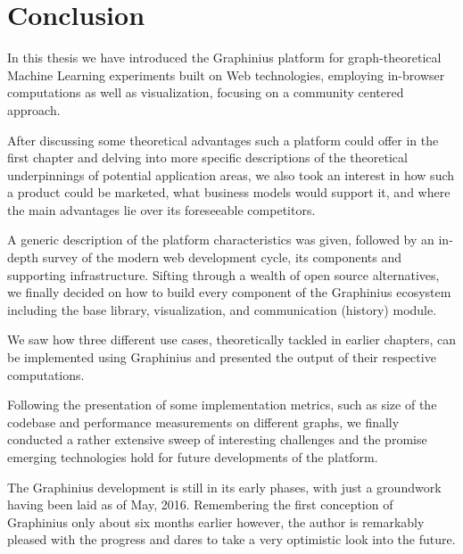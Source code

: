 \chapter{Conclusion}
\label{ch:conclusion}

In this thesis we have introduced the Graphinius platform for graph-theoretical Machine Learning experiments built on Web technologies, employing in-browser computations as well as visualization, focusing on a community centered approach.

After discussing some theoretical advantages such a platform could offer in the first chapter and delving into more specific descriptions of the theoretical underpinnings of potential application areas, we also took an interest in how such a product could be marketed, what business models would support it, and where the main advantages lie over its foreseeable competitors.

A generic description of the platform characteristics was given, followed by an in-depth survey of the modern web development cycle, its components and supporting infrastructure. Sifting through a wealth of open source alternatives, we finally decided on how to build every component of the Graphinius ecosystem including the base library, visualization, and communication (history) module.

We saw how three different use cases, theoretically tackled in earlier chapters, can be implemented using Graphinius and presented the output of their respective computations.

Following the presentation of some implementation metrics, such as size of the codebase and performance measurements on different graphs, we finally conducted a rather extensive sweep of interesting challenges and the promise emerging technologies hold for future developments of the platform.

The Graphinius development is still in its early phases, with just a groundwork having been laid as of May, 2016. Remembering the first conception of Graphinius only about six months earlier however, the author is remarkably pleased with the progress and dares to take a very optimistic look into the future.